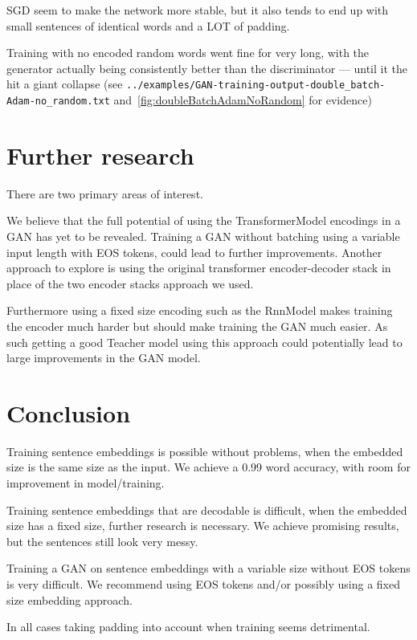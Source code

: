 \documentclass{article}
\begin{document}
SGD seem to make the network more stable, but it also tends to end up with small
sentences of identical words and a LOT of padding.

Training with no encoded random words went fine for very long, with the
generator actually being consistently better than the discriminator --- until it
the hit a giant collapse (see
\texttt{../examples/GAN-training-output-double\_batch-Adam-no\_random.txt}
and~\ref{fig:doubleBatchAdamNoRandom} for evidence)


\section{Further research}\label{sec:furtherResearch}
There are two primary areas of interest.

We believe that the full potential of using the TransformerModel encodings
in a GAN has yet to be revealed. Training a GAN without batching using a variable
input length with EOS tokens, could lead to further improvements. Another approach
to explore is using the original transformer encoder-decoder stack in place of the two encoder stacks approach we used.

Furthermore using a fixed size encoding such as the RnnModel makes training the encoder much harder
but should make training the GAN much easier. As such getting a good Teacher model using this
approach could potentially lead to large improvements in the GAN model.

\section{Conclusion}\label{sec:conclusion}
Training sentence embeddings is possible without problems,
when the embedded size is the same size as the input.
We achieve a 0.99 word accuracy, with room for improvement in model/training.

Training sentence embeddings that are decodable is difficult, when the embedded
size has a fixed size, further research is necessary.
We achieve promising results, but the sentences still look very messy.

Training a GAN on sentence embeddings with a variable size without
EOS tokens is very difficult. We recommend using EOS tokens and/or possibly
using a fixed size embedding approach.

In all cases taking padding into account when training seems detrimental.

\newpage
\printbibliography%
\end{document}
